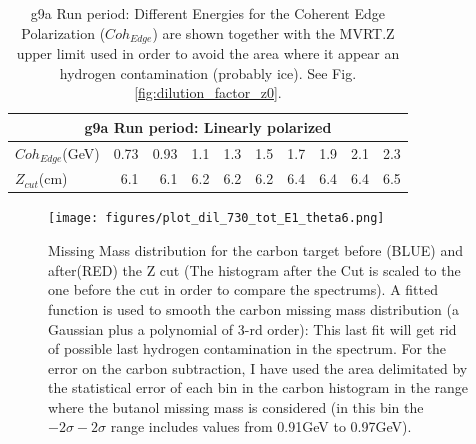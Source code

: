 \begin{table}
  \begin{center}
    \begin{tabular}{ ||l|r|r|r|r|r|r|r|r|r||}
      \hline
      \multicolumn{10}{|c|}{g9a Run period: Linearly polarized } \\
      \hline
      $Coh_{Edge}$(GeV)&0.73&0.93&1.1&1.3&1.5&1.7&1.9&2.1&2.3 \\
      \hline
      $Z_{cut}$(cm)&6.1&6.1&6.2&6.2&6.2&6.4&6.4&6.4&6.5 \\
      \hline
    \end{tabular}
  \end{center}
  \caption{g9a Run period: Different Energies for the Coherent Edge Polarization ($Coh_{Edge}$) are shown together with the MVRT.Z upper limit used in order to avoid the area where it appear an hydrogen contamination (probably ice). See Fig. \ref{fig:dilution_factor_z0}.}
  \label{table:dil_factor_zcut}
\end{table}

\begin{figure}[htb]
  \begin{center}
    \texttt{[image: figures/plot\_dil\_730\_tot\_E1\_theta6.png]} \\
    \caption{Missing Mass distribution for the carbon target before (BLUE) and after(RED) the Z cut (The histogram after the Cut is scaled to the one before the cut in order to compare the spectrums). A fitted function is used to smooth the carbon missing mass distribution (a Gaussian plus a polynomial of 3-rd order): This last fit will get rid of possible last hydrogen contamination in the spectrum. For the error on the carbon subtraction, I have used the area delimitated by the statistical error of each bin in the carbon histogram in the range where the butanol missing mass is considered (in this bin the $-2\sigma - 2\sigma$ range includes values from 0.91GeV to 0.97GeV).}
    \label{fig:dilution_mass_zcut}
  \end{center}
\end{figure}



